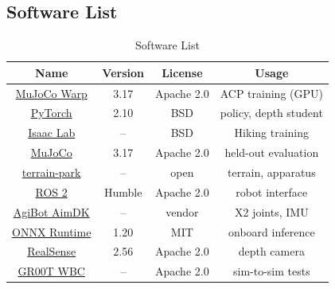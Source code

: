 \documentclass[journal]{IEEEtran}
\begin{document}
\subsection{Software List}
\begin{table}[!h]
\renewcommand{\arraystretch}{1}
 \tabcolsep=0.1cm
\caption{Software List}
\label{tab:SoftwareList}
\centering
\begin{tabular}{|c|c|c|c|}
\hline
Name & Version & License & Usage \\
\hline
\href{https://github.com/google-deepmind/mujoco_warp}{MuJoCo Warp} & 3.17 & Apache 2.0 & ACP training (GPU) \\
\href{https://pytorch.org}{PyTorch} & 2.10 & BSD & policy, depth student \\
\href{https://isaac-sim.github.io/IsaacLab}{Isaac Lab} & -- & BSD & Hiking training \\
\href{https://mujoco.org}{MuJoCo} & 3.17 & Apache 2.0 & held-out evaluation \\
\href{https://github.com/meetsitaram/terrain-park}{terrain-park} & -- & open & terrain, apparatus \\
\href{https://docs.ros.org/en/humble/}{ROS 2} & Humble & Apache 2.0 & robot interface \\
\href{https://x2-aimdk.agibot.com}{AgiBot AimDK} & -- & vendor & X2 joints, IMU \\
\href{https://onnxruntime.ai}{ONNX Runtime} & 1.20 & MIT & onboard inference \\
\href{https://github.com/IntelRealSense/librealsense}{RealSense} & 2.56 & Apache 2.0 & depth camera \\
\href{https://github.com/NVlabs/GR00T-WholeBodyControl}{GR00T WBC} & -- & Apache 2.0 & sim-to-sim tests \\
\hline
\end{tabular}
\end{table}



\end{document}
